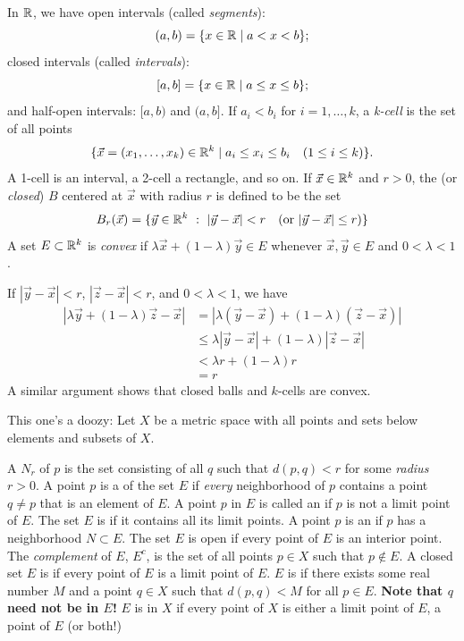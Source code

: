 \documentclass{article}
\begin{document}
\begin{definition}
    In $\mathbb R$, we have open intervals (called \textit{segments}): 
    \[(a,b)=\{x\in\mathbb R\mid a<x<b\};\] closed intervals (called \textit{intervals}): 
    \[[a,b]=\{x\in\mathbb R \mid a\leq x\leq b\};\] and half-open intervals: $[a,b)$ and $(a,b]$. If $a_{i}<b_{i}$ for $i=1,\dotsc,k$, a \textit{k-cell} is the set of all points 
    \[\{\vec{x}=(x_{1},\dotsc,x_{k})\in\mathbb R^{k}\mid a_{i}\leq x_{i}\leq b_{i}\quad (1\leq i\leq k)\}.\]A 1-cell is an interval, a 2-cell a rectangle, and so on. If $\vec{x}\in\mathbb R^{k}$ and $r>0$, the  (or \textit{closed})  $B$ centered at $\vec{x}$ with radius $r$ is defined to be the set 
    \[B_{r}(\vec{x})=\{\vec{y}\in\mathbb R^{k}\,\,:\,\, |\vec{y}-\vec{x}|<r \quad (\textrm{or }|\vec{y}-\vec{x}|\leq r)\}\]
    A set $E\subset \mathbb R^{k}$ is \textit{convex} if $\lambda\vec{x}+(1-\lambda)\vec{y}\in E$ whenever $\vec{x},\vec{y}\in E$ and $0<\lambda<1$.
\end{definition}
\begin{example}
    If $|\vec{y}-\vec{x}|<r$, $|\vec{z}-\vec{x}|<r$, and $0<\lambda<1$, we have \begin{align*}
        |\lambda\vec{y}+(1-\lambda)\vec{z}-\vec{x}| & = |\lambda(\vec{y}-\vec{x})+(1-\lambda)(\vec{z}-\vec{x})|\\
        & \leq \lambda|\vec{y}-\vec{x}|+(1-\lambda)|\vec{z}-\vec{x}|\\
        & < \lambda r+(1-\lambda)r\\
        & = r
    \end{align*}
    A similar argument shows that closed balls and $k$-cells are convex.
\end{example}
\newpage
\begin{definition}
    This one's a doozy: Let $X$ be a metric space with all points and sets below elements and subsets of $X$.
    \begin{enumerate}
        \ii A  $N_{r}$ of $p$ is the set consisting of all $q$ such that $d(p,q)<r$ for some \textit{radius} $r>0$.
        \ii A point $p$ is a  of the set $E$ if \textit{every} neighborhood of $p$ contains a point $q\neq p$ that is an element of $E$. 
        \ii A point $p$ in $E$ is called an  if $p$ is not a limit point of $E$.
        \ii The set $E$ is  if it contains all its limit points.
        \ii A point $p$ is an  if $p$ has a neighborhood $N\subset E$.
        \ii The set $E$ is open if every point of $E$ is an interior point.
        \ii The \textit{complement} of $E$, $E^{c}$, is the set of all points $p\in X$ such that $p\not\in E$.
        \ii A closed set $E$ is  if every point of $E$ is a limit point of $E$.
        \ii $E$ is  if there exists some real number $M$ and a point $q\in X$ such that $d(p,q)<M$ for all $p\in E$. \textbf{Note that $q$ need not be in $E$!}
        \ii $E$ is  in $X$ if every point of $X$ is either a limit point of $E$, a point of $E$ (or both!) 
    \end{enumerate}
\end{definition}
\end{document}
